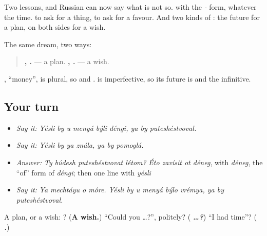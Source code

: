 \begin{grammarlens}[title={What you've built}]
Two lessons, and Russian can now say what is not so. \textbf{} with the \emph{-} form, whatever the time. \textbf{  } to ask for a thing, \textbf{   } to ask for a favour. And two kinds of \emph{}: the future for a plan, \textbf{} on both sides for a wish.

The same dream, two ways:

\begin{quote}
\textbf{    ,   .} — a plan. \textbf{     ,   .} — a wish.
\end{quote}

\emph{}, \textquotedblleft{}money\textquotedblright{}, is plural, so \emph{} and \emph{}. \emph{} is imperfective, so its future is \emph{} and the infinitive.
\end{grammarlens}

\subsection*{Your turn}
\begin{itemize}
\raggedright
  \item \emph{Say it:} \emph{Yésli by u menyá býli déngi, ya by puteshéstvoval.}
  \item \emph{Say it:} \emph{Yésli by ya znála, ya by pomoglá.}
  \item \emph{Answer:} \emph{Ty búdesh puteshéstvovat létom?} \emph{Éto zavísit ot déneg}, with \emph{déneg}, the \textquotedblleft{}of\textquotedblright{} form of \emph{déngi}; then one line with \emph{yésli}
  \item \emph{Say it:} \emph{Ya mechtáyu o móre. Yésli by u menyá býlo vrémya, ya by puteshéstvoval.}
\end{itemize}

\begin{tcolorbox}[breakable,colback=teal!4,colframe=teal!35!black,title={Before you move on}]
A plan, or a wish: \emph{     }? (\textbf{A wish.}) \textquotedblleft{}Could you …?\textquotedblright{}, politely? (\emph{\textbf{    …?}}) \textquotedblleft{}I had time\textquotedblright{}? (\emph{\textbf{   .}})
\end{tcolorbox}
